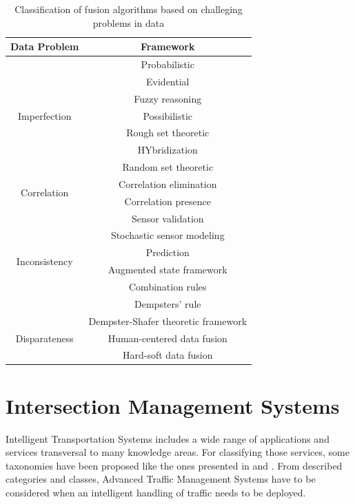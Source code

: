 \begin{table}[ht!]
\footnotesize
\centering
\begin{tabular}{|c|c|}
\hline
\textbf{Data Problem} & \textbf{Framework} \\
\hline
\multirow{7}{*}{Imperfection} & Probabilistic \\
& Evidential \\
& Fuzzy reasoning \\
& Possibilistic \\
& Rough set theoretic \\
& HYbridization \\
& Random set theoretic \\
\hline
\multirow{2}{*}{Correlation} & Correlation elimination \\
& Correlation presence \\
\hline
\multirow{6}{*}{Inconsistency} & Sensor validation \\
& Stochastic sensor modeling\\
& Prediction \\
& Augmented state framework \\
& Combination rules \\
& Dempsters' rule \\
\hline
\multirow{3}{*}{Disparateness} & Dempster-Shafer theoretic framework \\
& Human-centered data fusion \\
& Hard-soft data fusion \\
\hline
\end{tabular}
\caption{Classification of fusion algorithms based on challeging problems in data}
\label{fusionAlgClasKhaleghi}
\end{table}


\section{Intersection Management Systems}

Intelligent Transportation Systems includes a wide range of applications and services transversal to many knowledge areas. For classifying those services, some taxonomies have been proposed like the ones presented in \cite[Ch.1]{Sussman2005} and \cite{Williams2008}. From described categories and classes, Advanced Traffic Management Systems have to be considered when an intelligent handling of traffic needs to be deployed.

